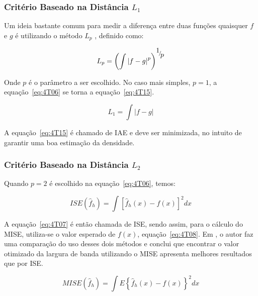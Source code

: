 \subsubsection{Critério Baseado na Distância ${L_1}$}

Um ideia bastante comum para medir a diferença entre duas funções quaisquer $f$ e $g$ é utilizando o método ${L_p}$ \cite{kernelthesis}, definido como:

\begin{equation}\label{eq:4T06}
   {L_p} = {\left( {\int {{{\left| {f - g} \right|}^p}} } \right)^{{\raise0.7ex\hbox{$1$} \!\mathord{\left/
 {\vphantom {1 p}}\right.\kern-\nulldelimiterspace}
\!\lower0.7ex\hbox{$p$}}}}
\end{equation}

Onde $p$ é o parâmetro a ser escolhido. No caso mais simples, $p=1$, a equação~\ref{eq:4T06} se torna a equação~\ref{eq:4T15}.

\begin{equation}\label{eq:4T15}
{L_1} = {\int {\left| {f - g} \right|} }
\end{equation}

A equação~\ref{eq:4T15} é chamado de \ac{IAE} e deve ser minimizada, no intuito de garantir uma boa estimação da densidade.

\subsubsection{Critério Baseado na Distância ${L_2}$}\label{sec:mise}

Quando $p=2$ é escolhido na equação~\ref{eq:4T06}, temos:

\begin{equation}\label{eq:4T07}
ISE\left( {{{\hat f}_h}} \right) = \int {{{\left[ {{{\hat f}_h}\left( x \right) - f\left( x \right)} \right]}^2}dx}
\end{equation}

A equação~\ref{eq:4T07} é então chamada de \ac{ISE}, sendo assim, para o cálculo do \ac{MISE}, utiliza-se o valor esperado de $f\left( x \right)$, equação~\ref{eq:4T08}. Em \cite{jones1991roles}, o autor faz uma comparação do uso desses dois métodos e conclui que encontrar o valor otimizado da largura de banda utilizando o MISE apresenta melhores resultados que por ISE.

\begin{equation}\label{eq:4T08}
MISE\left( {{{\hat f}_h}} \right) = \int {E{{\left\{ {{{\hat f}_h}\left( x \right) - f\left( x \right)} \right\}}^2}dx}
\end{equation}

